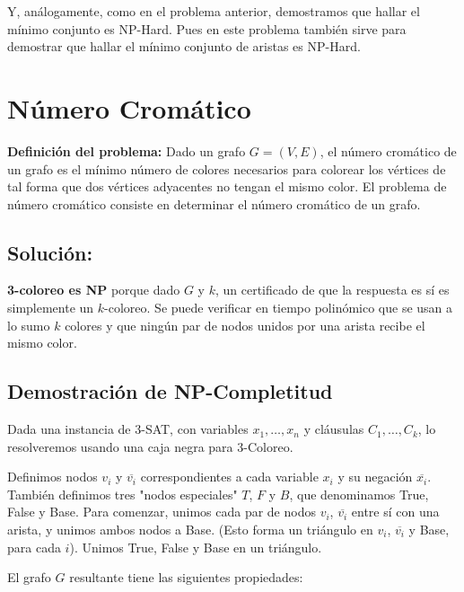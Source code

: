 \documentclass[9pt]{article}
\begin{document}
Y, análogamente, como en el problema anterior, demostramos que hallar el mínimo conjunto es NP-Hard. Pues en este problema también sirve para demostrar que hallar el mínimo conjunto de aristas es NP-Hard.


\section*{Número Cromático}

\textbf{Definición del problema:} Dado un grafo $G = (V, E)$, el número cromático de un grafo es el mínimo número de colores necesarios para colorear los vértices de tal forma que dos vértices adyacentes no tengan el mismo color. El problema de número cromático consiste en determinar el número cromático de un grafo.

\subsection*{Solución:}

\textbf{3-coloreo es NP} porque dado \( G \) y \( k \), un certificado de que la respuesta es sí es simplemente un \( k \)-coloreo. Se puede verificar en tiempo polinómico que se usan a lo sumo \( k \) colores y que ningún par de nodos unidos por una arista recibe el mismo color.

\subsection*{Demostración de \textbf{NP-Completitud}}

Dada una instancia de 3-SAT, con variables \( x_1, \ldots, x_n \) y cláusulas \( C_1, \ldots, C_k \), lo resolveremos usando una caja negra para 3-Coloreo.

Definimos nodos \( v_i \) y \( \overline{v_i} \) correspondientes a cada variable \( x_i \) y su negación \( \overline{x_i} \). También definimos tres "nodos especiales" \( T \), \( F \) y \( B \), que denominamos True, False y Base. Para comenzar, unimos cada par de nodos \( v_i \), \( \overline{v_i} \) entre sí con una arista, y unimos ambos nodos a Base. (Esto forma un triángulo en \( v_i \), \( \overline{v_i} \) y Base, para cada \( i \)). Unimos True, False y Base en un triángulo. 

El grafo $G$ resultante tiene las siguientes propiedades:
\end{document}
